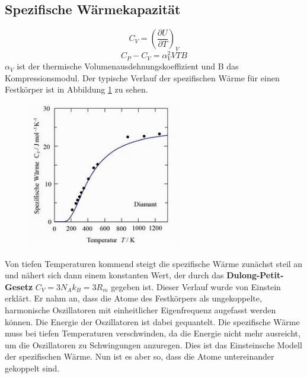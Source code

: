 \documentclass[11pt]{article}
\begin{document}
\subsection{Spezifische Wärmekapazität}
\begin{equation}
  C_V=\left(\frac{\partial U}{\partial T}\right)_V
\end{equation}
\begin{equation}
  C_P-C_V=\alpha^2_VVTB
\end{equation}
$\alpha_V$ ist der thermische Volumenausdehnungskoeffizient und B das
Kompressionsmodul. Der typische Verlauf der spezifischen Wärme für einen
Festkörper ist in Abbildung \ref{fig:spezifische} zu sehen.
\begin{figure}[h]
\includegraphics[width=0.6\textwidth]{spezifische}
\centering
\label{fig:spezifische}
\end{figure}

Von tiefen Temperaturen kommend steigt die spezifische Wärme zunächst steil an
und nähert sich dann einem konstanten Wert, der durch das \textbf{Dulong-Petit-
Gesetz} $C_V=3N_Ak_B=3R_m$ gegeben ist. Dieser Verlauf wurde von Einstein
erklärt. Er nahm an, dass die Atome des Festkörpers als ungekoppelte,
harmonische Oszillatoren mit einheitlicher Eigenfrequenz augefasst werden
können. Die Energie der Oszillatoren ist dabei gequantelt. Die spezifische
Wärme muss bei tiefen Temperaturen verschwinden, da die Energie nicht mehr
ausreicht, um die Oszillatoren zu Schwingungen anzuregen. Dies ist das
Einsteinsche Modell der spezifischen Wärme. Nun ist es aber so, dass die Atome
untereinander gekoppelt sind.
\end{document}

